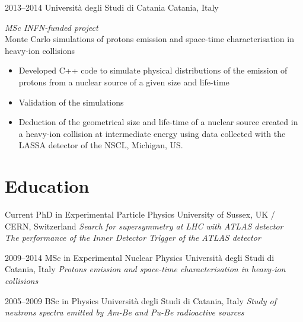 \documentclass[print]{cv} %
\begin{document}
  \begin{entrylist}
    \entry
    {2013--2014}
    {Università degli Studi di Catania}
    {Catania, Italy}
    {\emph{MSc INFN-funded project}\\
    Monte Carlo simulations of protons emission and space-time characterisation in heavy-ion collisions
    \begin{itemize}
      \item Developed C++ code to simulate physical distributions of the emission of protons from a nuclear source of a given size and life-time
      \item Validation of the simulations
      \item Deduction of the geometrical size and life-time of a nuclear source created in a heavy-ion collision at intermediate energy using data collected with the LASSA detector of the NSCL, Michigan, US.
    \end{itemize}
    }
  \end{entrylist}

\section{Education}

\begin{entrylist}
  \entry
      {Current}
      {PhD {\normalfont in Experimental Particle Physics}}
      {University of Sussex, UK / CERN, Switzerland}
      {\emph{Search for supersymmetry at LHC with ATLAS detector\\
      The performance of the Inner Detector Trigger of the ATLAS detector}
      }

  \entry
      {2009--2014}
      {MSc {\normalfont in Experimental Nuclear Physics}}
      {Università degli Studi di Catania, Italy}
      {\emph{Protons emission and space-time characterisation in heavy-ion collisions} }

  \entry
      {2005--2009}
      {BSc {\normalfont in Physics}}
      {Università degli Studi di Catania, Italy}
      {\emph{Study of neutrons spectra emitted by Am-Be and Pu-Be radioactive sources}}
\end{entrylist}
\end{document}
